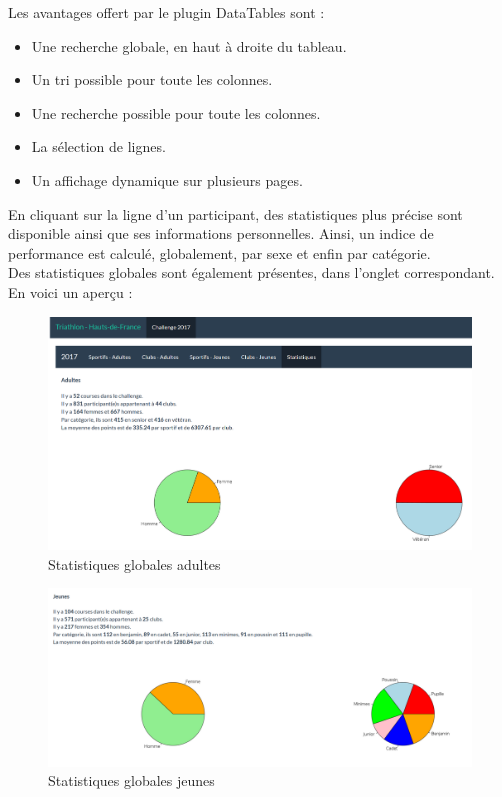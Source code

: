 Les avantages offert par le plugin DataTables sont :

\begin{itemize} 
	\item Une recherche globale, en haut à droite du tableau.
	\item Un tri possible pour toute les colonnes.
	\item Une recherche possible pour toute les colonnes.
	\item La sélection de lignes.
	\item Un affichage dynamique sur plusieurs pages.
\end{itemize}

En cliquant sur la ligne d'un participant, des statistiques plus précise sont disponible ainsi que ses informations personnelles.
Ainsi, un indice de performance est calculé, globalement, par sexe et enfin par catégorie. \\

Des statistiques globales sont également présentes, dans l'onglet correspondant.
En voici un aperçu :


\begin{figure}[!h]
	\center
	\includegraphics[scale=0.55]{img/statsad.PNG}
	\caption {Statistiques globales adultes}
\end{figure}
\begin{figure}[!h]
	\center
	\includegraphics[scale=0.55]{img/statsjn.PNG}
	\caption {Statistiques globales jeunes}
\end{figure}


